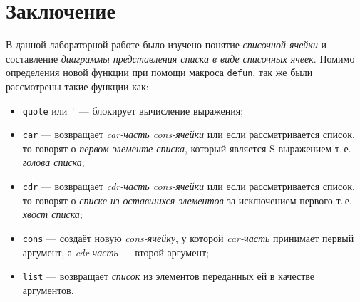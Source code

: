 \section{Заключение}

В данной лабораторной работе было изучено понятие \textit{списочной ячейки} и составление \textit{диаграммы представления списка в виде списочных ячеек}. Помимо определения новой функции при помощи макроса \verb|defun|, так же были рассмотрены такие функции как:
\begin{itemize}
	\item \verb|quote| или \verb|'| --- блокирует вычисление выражения;
	\item \verb|car| --- возвращает \textit{car-часть cons-ячейки} или если рассматривается список, то говорят о \textit{первом элементе списка}, который является S-выражением т.\,е. \textit{голова списка};
	\item \verb|cdr| --- возвращает \textit{cdr-часть cons-ячейки} или если рассматривается список, то говорят о \textit{списке из оставшихся элементов} за исключением первого т.\,е. \textit{хвост списка};
	\item \verb|cons| --- создаёт новую \textit{cons-ячейку}, у которой \textit{car-часть} принимает первый аргумент, а \textit{cdr-часть} --- второй аргумент;
	\item \verb|list| --- возвращает \textit{список} из элементов переданных ей в качестве аргументов.
\end{itemize}
